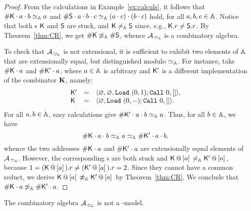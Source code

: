 \begin{proof} From the calculations in Example~\ref{ex:calculs}, it follows that $\#{\mathsf{K}}\cdot a\cdot b\simeq_{\mathbb{A}} a$ and
$\#{\mathsf{S}}\cdot a\cdot b\cdot c\simeq_{\mathbb{A}} (a\cdot c)\cdot (b\cdot c)$ hold, for all $a,b,c\in\mathbb{A}$.
Notice that both \am s $\mathsf K$ and $\mathsf S$ are stuck, and $\mathsf K\neq_{\mathbb{A}} \mathsf S$ since, e.g., $\mathsf K.r\neq\mathsf S.r$.
By Theorem~\ref{thm:CR}, we get $\#\mathsf K\not\simeq_{\mathbb{A}}\# \mathsf S$, whence $\mathcal{A}_{\,\simeq_{\mathbb{A}}}$ is a combinatory algebra.

To check that $\mathcal{A}_{\,\simeq_{\mathbb{A}}}$ is not extensional, it is sufficient to exhibit two elements of $\mathbb{A}$ that are extensionally equal, but distinguished modulo $\simeq_{\mathbb{A}}$.
For instance, take $\#\mathsf K\cdot a$ and $\#\mathsf K'\cdot a$, where $a\in\mathbb{A}$ is arbitrary and $\mathsf K'$ is a different implementation of the combinator ${\mathbf{K}}$, namely:
\[
	\begin{array}{lcl}
	\mathsf K' &=& \langle \varnothing,\varnothing,\mathtt{Load}~(0, 1); \mathtt{Call}~0,[]\rangle, \\
	\mathsf K &=& \langle \varnothing,\mathtt{Load}~(0,-); \mathtt{Call}~0,[]\rangle.
	\end{array}
\]
For all $a,b\in\mathbb{A}$, easy calculations give $\#\mathsf K'\cdot a\cdot b \simeq_{\mathbb{A}} a$.
Thus, for all $b\in\mathbb{A}$, we have \[
	\#\mathsf K\cdot a\cdot b \simeq_{\mathbb{A}} a\simeq_{\mathbb{A}} \#\mathsf K'\cdot a\cdot b,
	\]
	whence the two addresses $\#\mathsf K\cdot a$ and $ \#\mathsf K'\cdot a$ are extensionally equal elements of $\mathcal{A}_{\,\simeq_{\mathbb{A}}}$.
However, the corresponding \am s are both stuck and $\mathsf K\,@\,[a]\, \neq_{\mathbb{A}} \mathsf K'\,@\,[a]\,$, because $1 = (\mathsf K\,@\,{[}a{]}\,).r \neq (\mathsf K'\,@\,{[}a{]}\,).r = 2$.
Since they cannot have a common reduct, we derive $\mathsf K\,@\,[a]\,\not\equiv_{\mathbb{A}}\mathsf K'\,@\,[a]\,$ by Theorem~\ref{thm:CR}.
We conclude that $\#\mathsf K\cdot a \not\simeq_{\mathbb{A}} \#\mathsf K'\cdot a$.
\end{proof}

\begin{lem}\label{lem:notlambdalg}
The combinatory algebra $\mathcal{A}_{\,\simeq_{\mathbb{A}}}$ is not a \lam-model.
\end{lem}

